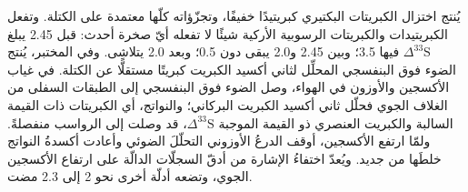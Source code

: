 يُنتج اختزال الكبريتات البكتيري كبريتيدًا خفيفًا، وتجزّؤاته
كلّها معتمدة على الكتلة. وتفعل الكبريتيدات والكبريتات الرسوبية الأركية شيئًا لا
تفعله أيّ صخرة أحدث: قبل \qty{2.45}{\Ga} يبلغ $\Delta^{33}\mathrm S$ فيها
\qty{3.5}{\permil}؛ وبين 2.45 و\qty{2.0}{\Ga} يبقى دون
\qty{0.5}{\permil}؛ وبعد \qty{2.0}{\Ga} يتلاشى. وفي المختبر،
يُنتج الضوء فوق البنفسجي المحلِّل لثاني أكسيد الكبريت كبريتًا مستقلًّا عن الكتلة.
في غياب الأكسجين والأوزون في الهواء، وصل الضوء فوق البنفسجي إلى
الطبقات السفلى من الغلاف الجوي فحلّل ثاني أكسيد الكبريت البركاني؛ والنواتج،
أي الكبريتات ذات القيمة السالبة والكبريت العنصري ذو القيمة الموجبة $\Delta^{33}\mathrm S$، قد وصلت إلى الرواسب منفصلةً.
ولمّا ارتفع الأكسجين، أوقف الدرعُ الأوزوني التحلّلَ الضوئي
وأعادت أكسدةُ النواتج خلطَها من جديد. ويُعدّ
اختفاءُ الإشارة من أدقّ السجلّات الدالّة على ارتفاع
الأكسجين الجوي، وتضعه أدلّة أخرى نحو 2 إلى
\qty{2.3}{\Ga} مضت.

\begin{omfigure}

\par{}\label{fig:b3:stable-isotopes:three-isotope}
\end{omfigure}

